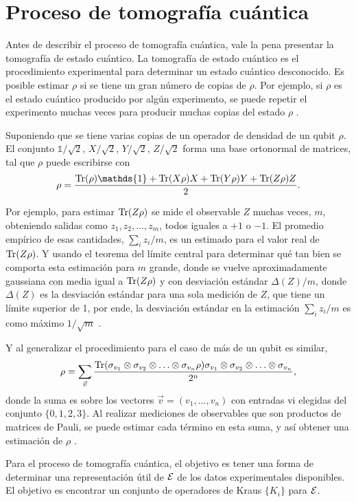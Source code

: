 \section{Proceso de tomografía cuántica}

Antes de describir el proceso de tomografía cuántica, vale la pena presentar la tomografía de estado cuántico. La tomografía de estado cuántico es el procedimiento experimental para determinar un estado cuántico desconocido. Es posible estimar $\rho$ si se tiene un gran número de copias de $\rho$. Por ejemplo, si $\rho$ es el estado cuántico producido por algún experimento, se puede repetir el experimento muchas veces para producir muchas copias del estado $\rho$ {\cite{nielsen_chuang_2010}}. 

Suponiendo que se tiene varias copias de un operador de densidad de un qubit $\rho$. El conjunto $\mathds{1}/\sqrt{2}$, $X/\sqrt{2}$, $Y/\sqrt{2}$, $Z/\sqrt{2}$ forma una base ortonormal de matrices, tal que $\rho$  puede escribirse con \[\rho=\dfrac{\tr(\rho)\mathds{1}+\tr(X\rho)X+\tr(Y\rho)Y+\tr(Z\rho)Z}{2}.\]

Por ejemplo, para estimar ${\rm Tr}(Z\rho)$ se mide el observable $Z$ muchas veces, $m$, obteniendo salidas como $z_1,z_2,\ldots,z_m$, todos iguales a $+1$ o $-1$. El promedio empírico de esas cantidades, $\sum_i z_i/m$, es un estimado para el valor real de ${\rm Tr}(Z\rho)$. Y usando el teorema del límite central para determinar qué tan bien se comporta esta estimación para $m$ grande, donde se vuelve aproximadamente gaussiana con media igual a ${\rm Tr}(Z\rho)$ y con desviación estándar  $\Delta(Z)/ m$, donde $\Delta(Z)$ es la desviación estándar para una sola medición de $Z$, que tiene un límite superior de 1, por ende, la desviación estándar en la estimación $\sum_i z_i/m$ es como máximo $1/\sqrt{m}$ {\cite{nielsen_chuang_2010}}. 

Y al generalizar el procedimiento para el caso de más de un qubit es similar,
\[\rho=\sum_{\vec{v}}\dfrac{{\rm Tr}(\sigma_{v_1}\otimes\sigma_{v_2}\otimes \ldots \otimes \sigma_{v_n}\rho)\sigma_{v_1}\otimes\sigma_{v_2}\otimes \ldots \otimes \sigma_{v_n}}{2^n},\] donde la suma es sobre los vectores $\vec{v} = (v_1 ,\ldots, v_n )$ con entradas vi elegidas del conjunto $\{0, 1, 2, 3\}$. Al realizar mediciones de observables que son productos de matrices de Pauli, se puede estimar cada término en esta suma, y así obtener una estimación de $\rho$ {\cite{nielsen_chuang_2010}}.

Para el proceso de tomografía cuántica, el objetivo es tener una forma de determinar una representación útil de $\mathcal{E}$  de los datos experimentales disponibles. El objetivo es encontrar un conjunto de operadores de Kraus $\{K_i\}$ para $\mathcal{E}$.



